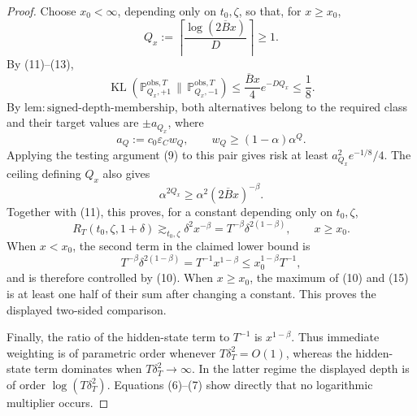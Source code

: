 \documentclass{article}
\begin{document}
\begin{proof}
Choose \(x_0<\infty\), depending only on \(t_0,\zeta\), so that, for \(x\ge x_0\),
\[
 Q_x:=\left\lceil\frac{\log(2\overline Bx)}D\right\rceil\ge1.
\]
By (11)--(13),
\[
 \operatorname{KL}(\mathbb P_{Q_x,+1}^{\mathrm{obs},T}\,\|\,
                    \mathbb P_{Q_x,-1}^{\mathrm{obs},T})
 \le\frac{\overline Bx}{4}e^{-DQ_x}\le\frac18. \tag{14}
\]
By \(\mathrm{lem{:}signed\text{-}depth\text{-}membership}\), both alternatives belong to the required class and their target values are \(\pm a_{Q_x}\), where
\[
 a_Q:=c_0\varepsilon_Cw_Q,
 \qquad
 w_Q\ge(1-\alpha)\alpha^Q.
\]
Applying the testing argument (9) to this pair gives risk at least \(a_{Q_x}^2e^{-1/8}/4\).  The ceiling defining \(Q_x\) also gives
\[
 \alpha^{2Q_x}\ge\alpha^2(2\overline Bx)^{-\beta}.
\]
Together with (11), this proves, for a constant depending only on \(t_0,\zeta\),
\[
 R_T(t_0,\zeta,1+\delta)
 \gtrsim_{t_0,\zeta}
 \delta^2x^{-\beta}
 =T^{-\beta}\delta^{2(1-\beta)},
 \qquad x\ge x_0. \tag{15}
\]
When \(x<x_0\), the second term in the claimed lower bound is
\[
 T^{-\beta}\delta^{2(1-\beta)}=T^{-1}x^{1-\beta}
 \le x_0^{1-\beta}T^{-1},
\]
and is therefore controlled by (10).  When \(x\ge x_0\), the maximum of (10) and (15) is at least one half of their sum after changing a constant.  This proves the displayed two-sided comparison.

Finally, the ratio of the hidden-state term to \(T^{-1}\) is \(x^{1-\beta}\).  Thus immediate weighting is of parametric order whenever \(T\delta_T^2=O(1)\), whereas the hidden-state term dominates when \(T\delta_T^2\to\infty\).  In the latter regime the displayed depth is of order \(\log(T\delta_T^2)\).  Equations (6)--(7) show directly that no logarithmic multiplier occurs.
\end{proof}
\end{document}
